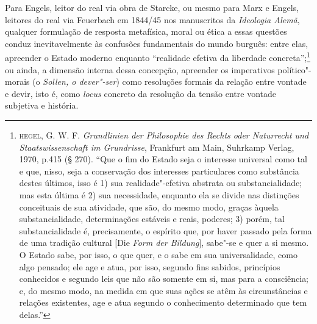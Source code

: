 Para Engels, leitor do real via obra de Starcke, ou mesmo para Marx e
Engels, leitores do real via Feuerbach em 1844/45 nos manuscritos da
\emph{Ideologia Alemã}, qualquer formulação de resposta metafísica,
moral ou ética a essas questões conduz inevitavelmente às confusões
fundamentais do mundo burguês: entre elas, apreender o Estado moderno
enquanto ``realidade efetiva da liberdade concreta'';\footnote{\textsc{hegel},
  G. W. F. \emph{Grundlinien der Philosophie des Rechts oder Naturrecht
  und Staatswissenschaft im Grundrisse}, Frankfurt am Main, Suhrkamp
  Verlag, 1970, p.415 (§ 270). ``Que o fim do Estado seja o interesse
  universal como tal e que, nisso, seja a conservação dos interesses
  particulares como substância destes últimos, isso é 1) sua
  realidade"-efetiva abstrata ou substancialidade; mas esta última é 2)
  sua necessidade, enquanto ela se divide nas distinções conceituais de
  sua atividade, que são, do mesmo modo, graças àquela substancialidade,
  determinações estáveis e reais, poderes; 3) porém, tal
  substancialidade é, precisamente, o espírito que, por haver passado
  pela forma de uma tradição cultural {[}Die \emph{Form der Bildung}{]},
  sabe"-se e quer a si mesmo. O Estado sabe, por isso, o que quer, e o
  sabe em sua universalidade, como algo pensado; ele age e atua, por
  isso, segundo fins sabidos, princípios conhecidos e segundo leis que
  não são somente em si, mas para a consciência; e, do mesmo modo, na
  medida em que suas ações se atêm às circunstâncias e relações
  existentes, age e atua segundo o conhecimento determinado que tem
  delas.''} ou ainda, a dimensão interna dessa concepção, apreender os
imperativos político"-morais (o \emph{Sollen, o dever"-ser}) como
resoluções formais da relação entre vontade e devir, isto é, como
\emph{locus} concreto da resolução da tensão entre vontade subjetiva e
história.

